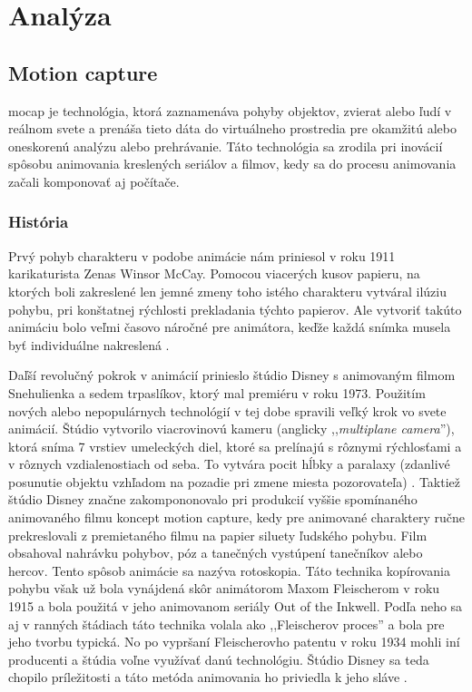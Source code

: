 \section{Analýza}%
\subsection{Motion capture}%
\noindent\acrfull{mocap} je technológia, ktorá zaznamenáva pohyby objektov, zvierat alebo ľudí v reálnom svete a prenáša tieto dáta do virtuálneho prostredia pre okamžitú alebo oneskorenú analýzu alebo prehrávanie. Táto technológia sa zrodila pri inovácií spôsobu animovania kreslených seriálov a filmov, kedy sa do procesu animovania začali komponovať aj počítače.

\subsubsection{História}%

Prvý pohyb charakteru v podobe animácie nám priniesol v roku 1911 karikaturista Zenas Winsor McCay. Pomocou viacerých kusov papieru, na ktorých boli zakreslené len jemné zmeny toho istého charakteru vytváral ilúziu pohybu, pri konštatnej rýchlosti prekladania týchto papierov. Ale vytvoriť takúto animáciu bolo veľmi časovo náročné pre animátora, keďže každá snímka musela byť individuálne nakreslená \cite{mocapFundamentals}. 

Daľší revolučný pokrok v animácií prinieslo štúdio Disney s animovaným filmom Snehulienka a sedem trpaslíkov, ktorý mal premiéru v roku 1973. Použitím nových alebo nepopulárnych technológií v tej dobe spravili veľký krok vo svete animácií. Štúdio vytvorilo viacrovinovú kameru (anglicky ,,\textit{multiplane camera}''), ktorá sníma 7 vrstiev umeleckých diel, ktoré sa prelínajú s rôznymi rýchlosťami a v rôznych vzdialenostiach od seba. To vytvára pocit hĺbky a paralaxy (zdanlivé posunutie objektu vzhľadom na pozadie pri zmene miesta pozorovateľa) \cite{multiplaneCam}. 
Taktiež štúdio Disney značne zakompononovalo pri produkcií vyššie spomínaného animovaného filmu koncept motion capture, kedy pre animované charaktery ručne prekreslovali z premietaného filmu na papier siluety ľudského pohybu. Film obsahoval nahrávku pohybov, póz a tanečných vystúpení tanečníkov alebo hercov. Tento spôsob animácie sa nazýva rotoskopia.
Táto technika kopírovania pohybu však už bola vynájdená skôr animátorom Maxom Fleischerom v roku 1915 a bola použitá v jeho animovanom seriály Out of the Inkwell. Podľa neho sa aj v ranných štádiach táto technika volala ako ,,Fleischerov proces'' a bola pre jeho tvorbu typická. No po vypršaní Fleischerovho patentu v roku 1934 mohli iní producenti a štúdia voľne využívať danú technológiu. 
Štúdio Disney sa teda chopilo príležitosti a táto metóda animovania ho priviedla k jeho sláve \cite{rotoscopeHistory}.

